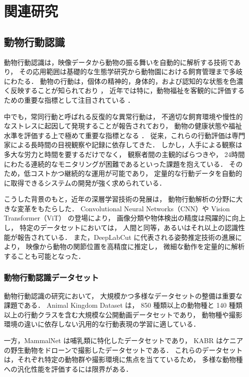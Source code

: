 \chapter{関連研究}

\section{動物行動認識}

動物行動認識は，映像データから動物の振る舞いを自動的に解析する技術であり，
その応用範囲は基礎的な生態学研究から動物園における飼育管理まで多岐にわたる．
動物の行動は，個体の精神的，身体的，および認知的な状態を色濃く反映することが知られており \cite{broom1986indicators}，
近年では特に，動物福祉を客観的に評価するための重要な指標として注目されている \cite{mellor2017updating}．

中でも，常同行動と呼ばれる反復的な異常行動は，
不適切な飼育環境や慢性的なストレスに起因して発現することが報告されており，
動物の健康状態や福祉水準を評価する上で極めて重要な指標となる \cite{mason1991stereotypies}．
従来，これらの行動評価は専門家による長時間の目視観察や記録に依存してきた．
しかし，人手による観察は多大な労力と時間を要するだけでなく，
観察者間の主観的ばらつきや，
24時間にわたる連続的なモニタリングが困難であるといった課題を抱えている．
そのため，低コストかつ継続的な運用が可能であり，
定量的な行動データを自動的に取得できるシステムの開発が強く求められている．

こうした背景のもと，近年の深層学習技術の発展は，
動物行動解析の分野に大きな変革をもたらした．
Convolutional Neural Networks（CNN）や
Vision Transformer（ViT）\cite{dosovitskiy2020vit} の登場により，
画像分類や物体検出の精度は飛躍的に向上し，
特定のデータセットにおいては，
人間と同等，あるいはそれ以上の認識性能が報告されている．
また，DeepLabCut \cite{mathis2018deeplabcut} に代表される姿勢推定技術の進展により，
映像から動物の関節位置を高精度に推定し，
微細な動作を定量的に解析することも可能となった．

\subsection{動物行動認識データセット}

動物行動認識の研究において，
大規模かつ多様なデータセットの整備は重要な課題である．
Animal Kingdom Dataset \cite{ng2022animal} は，
850 種類以上の動物種と 140 種類以上の行動クラスを含む大規模な公開動画データセットであり，
動物種や撮影環境の違いに依存しない汎用的な行動表現の学習に適している．

一方，MammalNet \cite{mammalnet} は哺乳類に特化したデータセットであり，
KABR \cite{kabr} はケニアの野生動物をドローンで撮影したデータセットである．
これらのデータセットは，それぞれ特定の動物群や撮影環境に焦点を当てているため，
多様な動物種への汎化性能を評価するには限界がある．

